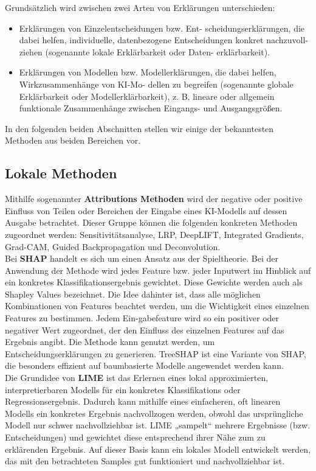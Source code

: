\documentclass[11pt,a4paper]{article}
\numberwithin{equation}{section}
\begin{document}
	Grundsätzlich wird zwischen zwei Arten von Erklärungen unterschieden:
	
	\begin{itemize}
		\item Erklärungen von Einzelentscheidungen bzw. Ent-
		scheidungserklärungen, die dabei helfen, individuelle,
		datenbezogene Entscheidungen konkret nachzuvoll-
		ziehen (sogenannte lokale Erklärbarkeit oder Daten-
		erklärbarkeit).
		\item Erklärungen von Modellen bzw. Modellerklärungen,
		die dabei helfen, Wirkzusammenhänge von KI-Mo-
		dellen zu begreifen (sogenannte globale Erklärbarkeit
		oder Modellerklärbarkeit), z. B. lineare oder allgemein
		funktionale Zusammenhänge zwischen Eingangs-
		und Ausgangsgrößen.
	\end{itemize}
	
	In den folgenden beiden Abschnitten stellen wir einige der bekanntesten Methoden aus beiden Bereichen vor.

	\subsection{Lokale Methoden}
	
	Mithilfe sogenannter \textbf{Attributions Methoden} wird der
	negative oder positive Einfluss von Teilen oder Bereichen der Eingabe eines KI-Modells auf dessen Ausgabe	betrachtet. Dieser Gruppe können die folgenden konkreten Methoden zugeordnet
	werden: Sensitivitätsanalyse, LRP, DeepLIFT, Integrated Gradients, Grad-CAM, Guided Backpropagation und
	Deconvolution.\\
	
	
	Bei \textbf{SHAP} handelt es sich um einen Ansatz aus der Spieltheorie. Bei der Anwendung der Methode wird jedes Feature bzw. jeder Inputwert im Hinblick auf ein 
	konkretes Klassifikationsergebnis gewichtet. Diese 
	Gewichte werden auch als Shapley Values bezeichnet. Die Idee dahinter ist, dass alle möglichen Kombinationen von Features beachtet werden, um die Wichtigkeit eines einzelnen Features zu bestimmen. Jedem Ein-gabefeature wird so ein positiver oder negativer Wert 
	zugeordnet, der den Einfluss des einzelnen Features auf 
	das Ergebnis angibt. Die Methode kann genutzt werden, um Entscheidungserklärungen zu generieren. TreeSHAP 
	ist eine Variante von SHAP, die besonders effizient auf baumbasierte Modelle angewendet werden kann.\\
	
	Die Grundidee von \textbf{LIME} ist das Erlernen eines lokal approximierten, interpretierbaren Modells für ein konkretes 
	Klassifikations­ oder Regressionsergebnis. Dadurch 
	kann mithilfe eines einfacheren, oft linearen Modells ein konkretes Ergebnis nachvollzogen werden, obwohl das ursprüngliche Modell nur schwer nachvollziehbar ist. LIME „sampelt“ mehrere Ergebnisse (bzw. Entscheidungen) und gewichtet diese entsprechend ihrer Nähe zum zu erklärenden Ergebnis. Auf dieser Basis kann ein lokales Modell entwickelt werden, das mit den betrachteten Samples gut funktioniert und nachvollziehbar ist.\\
	
\end{document}
